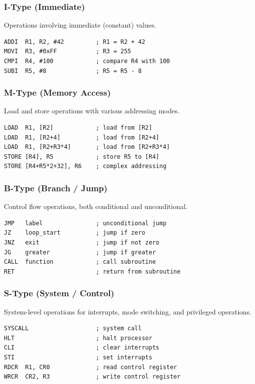 \documentclass[12pt]{article}
\begin{document}
\subsubsection{I-Type (Immediate)}

Operations involving immediate (constant) values.

\begin{lstlisting}
ADDI  R1, R2, #42         ; R1 = R2 + 42
MOVI  R3, #0xFF           ; R3 = 255
CMPI  R4, #100            ; compare R4 with 100
SUBI  R5, #8              ; R5 = R5 - 8
\end{lstlisting}

\subsubsection{M-Type (Memory Access)}

Load and store operations with various addressing modes.

\begin{lstlisting}
LOAD  R1, [R2]            ; load from [R2]
LOAD  R1, [R2+4]          ; load from [R2+4]
LOAD  R1, [R2+R3*4]       ; load from [R2+R3*4]
STORE [R4], R5            ; store R5 to [R4]
STORE [R4+R5*2+32], R6    ; complex addressing
\end{lstlisting}

\subsubsection{B-Type (Branch / Jump)}

Control flow operations, both conditional and unconditional.

\begin{lstlisting}
JMP   label               ; unconditional jump
JZ    loop_start          ; jump if zero
JNZ   exit                ; jump if not zero
JG    greater             ; jump if greater
CALL  function            ; call subroutine
RET                       ; return from subroutine
\end{lstlisting}

\subsubsection{S-Type (System / Control)}

System-level operations for interrupts, mode switching, and privileged operations.

\begin{lstlisting}
SYSCALL                   ; system call
HLT                       ; halt processor
CLI                       ; clear interrupts
STI                       ; set interrupts
RDCR  R1, CR0             ; read control register
WRCR  CR2, R3             ; write control register
\end{lstlisting}
\end{document}
